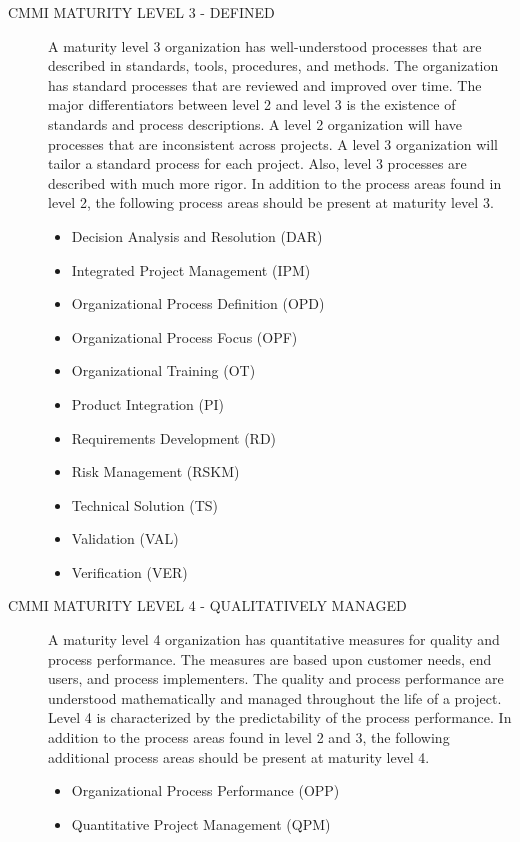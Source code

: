 \documentclass[SDSUThesis.tex]{subfiles}
\begin{document}
\begin{description}
        \item[CMMI MATURITY LEVEL 3 - DEFINED]
            A maturity level 3 organization has well-understood processes that are described in 
            standards, tools, procedures, and methods.  The organization has standard processes
            that are reviewed and improved over time.  The major differentiators between level 2 
            and level 3 is the existence of standards and process descriptions. 
            A level 2 organization will have
            processes that are inconsistent across projects.  A level 3 organization will tailor
            a standard process for each project.  Also, level 3 processes are described with 
            much more rigor.  In addition to the process areas found in level 2, 
            the following process areas should be present at maturity level 3.
            \begin{itemize}
                \item Decision Analysis and Resolution (DAR)
                \item Integrated Project Management (IPM)
                \item Organizational Process Definition (OPD)
                \item Organizational Process Focus (OPF)
                \item Organizational Training (OT)
                \item Product Integration (PI)
                \item Requirements Development (RD)
                \item Risk Management (RSKM)
                \item Technical Solution (TS)
                \item Validation (VAL)
                \item Verification (VER)
            \end{itemize}
            
        \item[CMMI MATURITY LEVEL 4 - QUALITATIVELY MANAGED]
            A maturity level 4 organization has quantitative measures for quality and process performance. 
            The measures are based upon customer needs, end users, and process implementers.  
            The quality
            and process performance are understood mathematically and managed 
            throughout the life of a project.
            Level 4 is characterized by the predictability of the process performance. 
            In addition to
            the process areas found in level 2 and 3, the following additional 
            process areas should be present
            at maturity level 4.
            \begin{itemize}
                \item Organizational Process Performance (OPP)
                \item Quantitative Project Management (QPM)
            \end{itemize}
            

\end{description}
\end{document}
